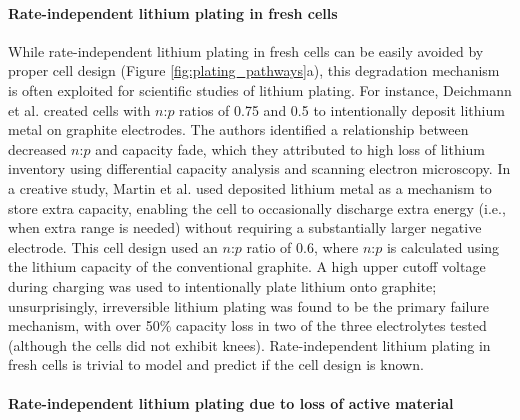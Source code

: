 \documentclass[journal=jpclcd,manuscript=article]{achemso}
\begin{document}
\paragraph{Rate-independent lithium plating in fresh cells}

While rate-independent lithium plating in fresh cells can be easily avoided by proper cell design (Figure \ref{fig:plating_pathways}a), this degradation mechanism is often exploited for scientific studies of lithium plating.
For instance, Deichmann et al.\cite{deichmann_investigating_2020} created cells with $n$:$p$ ratios of 0.75 and 0.5 to intentionally deposit lithium metal on graphite electrodes. The authors identified a relationship between decreased $n$:$p$ and capacity fade, which they attributed to high loss of lithium inventory using differential capacity analysis and scanning electron microscopy. In a creative study, Martin et al.\cite{martin_cycling_2020} used deposited lithium metal as a mechanism to store extra capacity, enabling the cell to occasionally discharge extra energy (i.e., when extra range is needed) without requiring a substantially larger negative electrode. This cell design used an $n$:$p$ ratio of 0.6, where $n$:$p$ is calculated using the lithium capacity of the conventional graphite. A high upper cutoff voltage during charging was used to intentionally plate lithium onto graphite; unsurprisingly, irreversible lithium plating was found to be the primary failure mechanism, with over 50\% capacity loss in two of the three electrolytes tested (although the cells did not exhibit knees). Rate-independent lithium plating in fresh cells is trivial to model and predict if the cell design is known.

\paragraph{Rate-independent lithium plating due to loss of active material}
\end{document}
